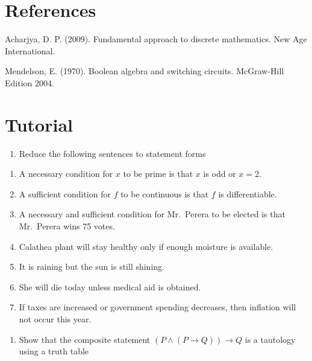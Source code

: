 \documentclass[]{book}
\providecommand{\tightlist}{%
  \setlength{\itemsep}{0pt}\setlength{\parskip}{0pt}}
\begin{document}
\hypertarget{references-1}{%
\section*{References}\label{references-1}}

Acharjya, D. P. (2009). Fundamental approach to discrete mathematics. New Age International.

Mendelson, E. (1970). Boolean algebra and switching circuits. McGraw-Hill Edition 2004.

\newpage
{}

\hypertarget{tutorial}{%
\section*{Tutorial}\label{tutorial}}

\begin{enumerate}
\def\labelenumi{\arabic{enumi}.}
\tightlist
\item
  Reduce the following sentences to statement forms
\end{enumerate}

\begin{enumerate}
\def\labelenumi{(\alph{enumi})}
\item
  A necessary condition for \(x\) to be prime is that \(x\) is odd or \(x=2\).
\item
  A sufficient condition for \(f\) to be continuous is that \(f\) is differentiable.
\item
  A necessary and sufficient condition for Mr.~Perera to be elected is that Mr.~Perera wins 75 votes.
\item
  Calathea plant will stay healthy only if enough moisture is available.
\item
  It is raining but the sun is still shining.
\item
  She will die today unless medical aid is obtained.
\item
  If taxes are increased or government spending decreases, then inflation will not occur this year.
\end{enumerate}

\begin{enumerate}
\def\labelenumi{\arabic{enumi}.}
\setcounter{enumi}{1}
\tightlist
\item
  Show that the composite statement \((P \land (P \rightarrow Q)) \rightarrow Q\) is a tautology using a truth table
\end{enumerate}
\end{document}
